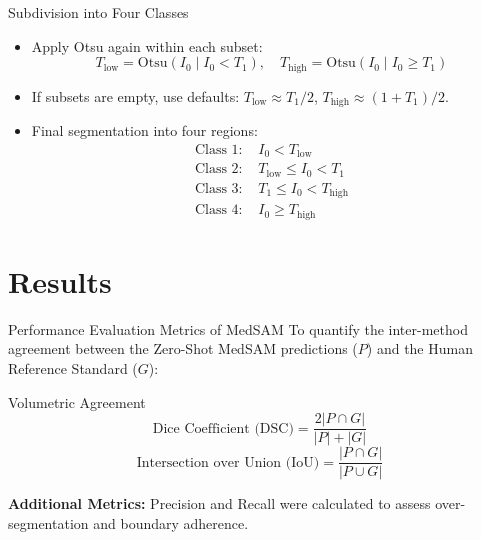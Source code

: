 \documentclass{beamer}
\begin{document}
\begin{frame}{Subdivision into Four Classes}
\begin{itemize}
    \item Apply Otsu again within each subset:
    \[
    T_{\text{low}} = \text{Otsu}(I_0 \mid I_0 < T_1), \quad
    T_{\text{high}} = \text{Otsu}(I_0 \mid I_0 \geq T_1)
    \]
    \item If subsets are empty, use defaults: $T_{\text{low}} \approx T_1/2$, $T_{\text{high}} \approx (1+T_1)/2$.
    \item Final segmentation into four regions:
    \[
    \begin{aligned}
    \text{Class 1: } & I_0 < T_{\text{low}} \\
    \text{Class 2: } & T_{\text{low}} \leq I_0 < T_1 \\
    \text{Class 3: } & T_1 \leq I_0 < T_{\text{high}} \\
    \text{Class 4: } & I_0 \geq T_{\text{high}}
    \end{aligned}
    \]
\end{itemize}
\end{frame}
\section{Results}
\begin{frame}{Performance Evaluation Metrics of MedSAM}
    To quantify the inter-method agreement between the Zero-Shot MedSAM predictions ($P$) and the Human Reference Standard ($G$):

    \begin{block}{Volumetric Agreement}
        \begin{equation*}
            \text{Dice Coefficient (DSC)} = \frac{2 |P \cap G|}{|P| + |G|}
        \end{equation*}
        \begin{equation*}
            \text{Intersection over Union (IoU)} = \frac{|P \cap G|}{|P \cup G|}
        \end{equation*}
    \end{block}

    \vspace{0.2cm}
    \textbf{Additional Metrics:} Precision and  Recall were calculated to assess over-segmentation and boundary adherence.
  \end{frame}
\end{document}
